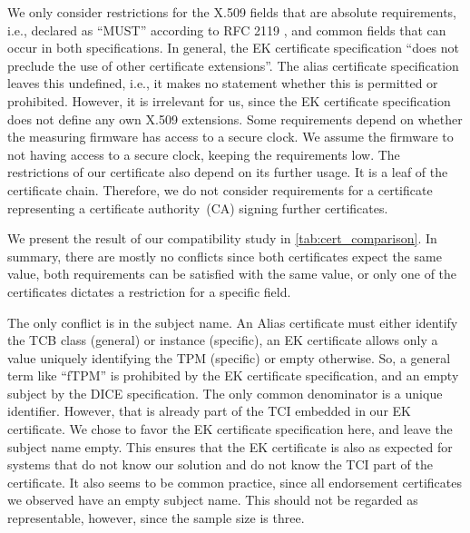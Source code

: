 We only consider restrictions for the X.509 fields that are absolute requirements, i.e., declared as ``MUST'' according to RFC 2119 \cite{Bradner1997}, and common fields that can occur in both specifications.
In general, the EK certificate specification ``does not preclude the use of other certificate extensions''.
The alias certificate specification leaves this undefined, i.e., it makes no statement whether this is permitted or prohibited.
However, it is irrelevant for us, since the EK certificate specification does not define any own X.509 extensions.
Some requirements depend on whether the measuring firmware has access to a secure clock.
We assume the firmware to not having access to a secure clock, keeping the requirements low.
The restrictions of our certificate also depend on its further usage.
It is a leaf of the certificate chain.
Therefore, we do not consider requirements for a certificate representing a certificate authority~(CA) signing further certificates.

We present the result of our compatibility study in \autoref{tab:cert_comparison}.
In summary, there are mostly no conflicts since both certificates expect the same value, both requirements can be satisfied with the same value, or only one of the certificates dictates a restriction for a specific field.



The only conflict is in the subject name.
An Alias certificate must either identify the TCB class (general) or instance (specific), an EK certificate allows only a value uniquely identifying the TPM (specific) or empty otherwise.
So, a general term like ``fTPM'' is prohibited by the EK certificate specification, and an empty subject by the DICE specification.
The only common denominator is a unique identifier.
However, that is already part of the TCI embedded in our EK certificate.
We chose to favor the EK certificate specification here, and leave the subject name empty.
This ensures that the EK certificate is also as expected for systems that do not know our solution and do not know the TCI part of the certificate.
It also seems to be common practice, since all endorsement certificates we observed have an empty subject name.
This should not be regarded as representable, however, since the sample size is three.

